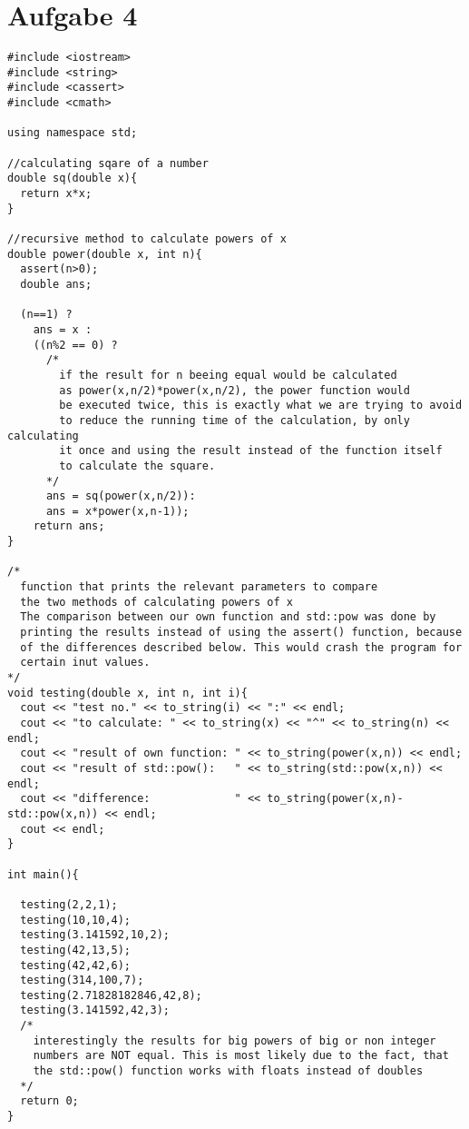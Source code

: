 \section*{Aufgabe 4}

\begin{lstlisting}
#include <iostream>
#include <string>
#include <cassert>
#include <cmath>

using namespace std;

//calculating sqare of a number
double sq(double x){
  return x*x;
}

//recursive method to calculate powers of x
double power(double x, int n){
  assert(n>0);
  double ans;

  (n==1) ?
    ans = x :
    ((n%2 == 0) ?
      /*
        if the result for n beeing equal would be calculated 
        as power(x,n/2)*power(x,n/2), the power function would 
        be executed twice, this is exactly what we are trying to avoid
        to reduce the running time of the calculation, by only calculating
        it once and using the result instead of the function itself
        to calculate the square.
      */
      ans = sq(power(x,n/2)):
      ans = x*power(x,n-1));
    return ans;
}

/*
  function that prints the relevant parameters to compare 
  the two methods of calculating powers of x
  The comparison between our own function and std::pow was done by 
  printing the results instead of using the assert() function, because
  of the differences described below. This would crash the program for 
  certain inut values.
*/
void testing(double x, int n, int i){
  cout << "test no." << to_string(i) << ":" << endl;
  cout << "to calculate: " << to_string(x) << "^" << to_string(n) << endl;
  cout << "result of own function: " << to_string(power(x,n)) << endl;
  cout << "result of std::pow():   " << to_string(std::pow(x,n)) << endl;
  cout << "difference:             " << to_string(power(x,n)-std::pow(x,n)) << endl;
  cout << endl;
}

int main(){

  testing(2,2,1);
  testing(10,10,4);
  testing(3.141592,10,2);
  testing(42,13,5);
  testing(42,42,6);
  testing(314,100,7);
  testing(2.71828182846,42,8);
  testing(3.141592,42,3);
  /*
    interestingly the results for big powers of big or non integer 
    numbers are NOT equal. This is most likely due to the fact, that 
    the std::pow() function works with floats instead of doubles
  */  
  return 0;
}
\end{lstlisting}